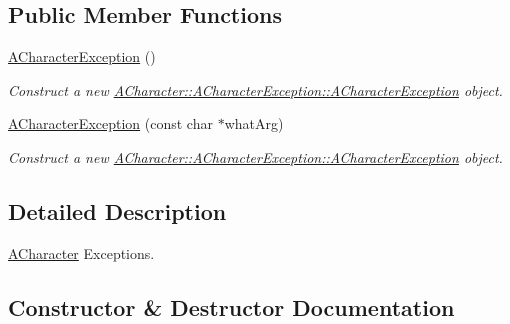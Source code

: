 \subsection*{Public Member Functions}
\begin{DoxyCompactItemize}
\item 
\mbox{\label{class_a_character_1_1_a_character_exception_a1a036384dac2c6291b82e1794ea3c845}} 
\hyperlink{class_a_character_1_1_a_character_exception_a1a036384dac2c6291b82e1794ea3c845}{A\+Character\+Exception} ()
\begin{DoxyCompactList}\small\item\em Construct a new \hyperlink{class_a_character_1_1_a_character_exception_a1a036384dac2c6291b82e1794ea3c845}{A\+Character\+::\+A\+Character\+Exception\+::\+A\+Character\+Exception} object. \end{DoxyCompactList}\item 
\hyperlink{class_a_character_1_1_a_character_exception_a9e2be4ec867121a74b049f38d3daaf46}{A\+Character\+Exception} (const char $\ast$what\+Arg)
\begin{DoxyCompactList}\small\item\em Construct a new \hyperlink{class_a_character_1_1_a_character_exception_a1a036384dac2c6291b82e1794ea3c845}{A\+Character\+::\+A\+Character\+Exception\+::\+A\+Character\+Exception} object. \end{DoxyCompactList}\end{DoxyCompactItemize}


\subsection{Detailed Description}
\hyperlink{class_a_character}{A\+Character} Exceptions. 

\subsection{Constructor \& Destructor Documentation}
\mbox{\label{class_a_character_1_1_a_character_exception_a9e2be4ec867121a74b049f38d3daaf46}} 
